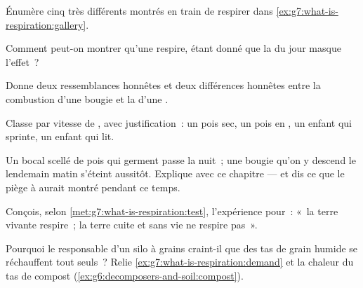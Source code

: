 \begin{exercise}[$\star$]\label{exo:g7:what-is-respiration:5}
Énumère cinq  très différents montrés en train de
respirer dans \cref{ex:g7:what-is-respiration:gallery}.
\end{exercise}

\begin{exercise}[$\star$]\label{exo:g7:what-is-respiration:6}
Comment peut-on montrer qu'une  respire, étant donné que la
 du jour masque l'effet~?
\end{exercise}

\begin{exercise}[$\star\star$]\label{exo:g7:what-is-respiration:7}
Donne deux ressemblances honnêtes et deux différences honnêtes entre
la combustion d'une bougie et la  d'une .
\end{exercise}

\begin{exercise}[$\star\star$]\label{exo:g7:what-is-respiration:8}
Classe par vitesse de , avec justification~: un pois sec,
un pois en , un enfant qui sprinte, un enfant qui lit.
\end{exercise}

\begin{exercise}[$\star\star$]\label{exo:g7:what-is-respiration:9}
Un bocal scellé de pois qui germent passe la nuit~; une bougie qu'on
y descend le lendemain matin s'éteint aussitôt. Explique avec ce
chapitre --- et dis ce que le piège à  aurait montré
pendant ce temps.
\end{exercise}

\begin{exercise}[$\star\star$]\label{exo:g7:what-is-respiration:10}
Conçois, selon \cref{met:g7:what-is-respiration:test}, l'expérience
pour~: «~la terre vivante respire~; la terre cuite et sans vie ne
respire pas~».
\end{exercise}

\begin{exercise}[$\star\star$]\label{exo:g7:what-is-respiration:11}
Pourquoi le responsable d'un silo à grains craint-il que des tas de
grain humide se réchauffent tout seuls~? Relie
\cref{ex:g7:what-is-respiration:demand} et la chaleur du tas de
compost (\cref{ex:g6:decomposers-and-soil:compost}).
\end{exercise}

